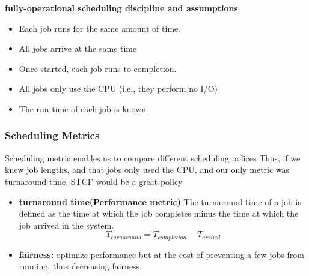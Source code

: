 \documentclass{article}
\begin{document}
\textbf{fully-operational scheduling discipline and assumptions}
\begin{itemize}
    \item Each job runs for the same amount of time.
    \item All jobs arrive at the same time
    \item Once started, each job runs to completion.
    \item All jobs only use the CPU (i.e., they perform no I/O)
    \item The run-time of each job is known.
\end{itemize}

\subsubsection{Scheduling Metrics}
{\color{red}Scheduling metric enables us to compare different scheduling polices}
{\color{red} Thus, if we knew job lengths, and that jobs only used the CPU, and our
only metric was turnaround time, STCF would be a great policy}
\begin{itemize}
    \item \textbf{turnaround time(Performance metric) }The turnaround time of a job is defined
as the time at which the job completes minus the time at which the job
arrived in the system.
$$T_{turnaround}=T_{completion}-T_{arrival}$$

\item \textbf{fairness: }optimize performance but at the cost of preventing a few jobs
from running, thus decreasing fairness.
\end{itemize}
\end{document}
